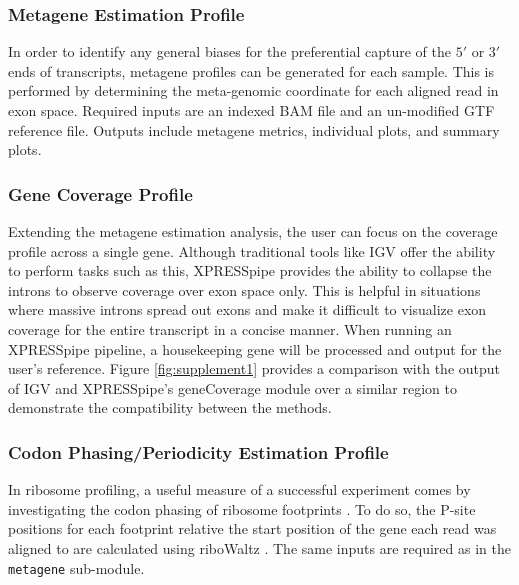 \documentclass[10pt, oneside]{article}
\begin{document}
\subsubsection{Metagene Estimation Profile}
In order to identify any general biases for the preferential capture of the $5'$ or $3'$ ends of transcripts, metagene profiles can be generated for each sample. This is performed by determining the meta-genomic coordinate for each aligned read in exon space. Required inputs are an indexed BAM file and an un-modified GTF reference file. Outputs include metagene metrics, individual plots, and summary plots.

\subsubsection{Gene Coverage Profile}
Extending the metagene estimation analysis, the user can focus on the coverage profile across a single gene. Although traditional tools like IGV \cite{igv} offer the ability to perform tasks such as this, XPRESSpipe provides the ability to collapse the introns to observe coverage over exon space only. This is helpful in situations where massive introns spread out exons and make it difficult to visualize exon coverage for the entire transcript in a concise manner. When running an XPRESSpipe pipeline, a housekeeping gene will be processed and output for the user's reference. Figure \ref{fig:supplement1} provides a comparison with the output of IGV \cite{igv} and XPRESSpipe's geneCoverage module over a similar region to demonstrate the compatibility between the methods.

\subsubsection{Codon Phasing/Periodicity Estimation Profile}
In ribosome profiling, a useful measure of a successful experiment comes by investigating the codon phasing of ribosome footprints \cite{ingolia_meth}. To do so, the P-site positions for each footprint relative the start position of the gene each read was aligned to are calculated using riboWaltz \cite{ribowaltz}. The same inputs are required as in the \texttt{metagene} sub-module.
\end{document}
